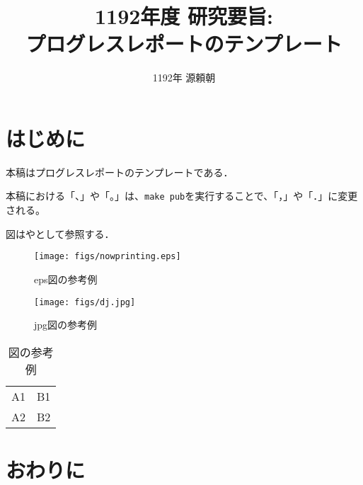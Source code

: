 \documentclass[twocolumn]{preport}
\title{1192年度 研究要旨: \\
プログレスレポートのテンプレート}
\author{1192年 源頼朝}
\begin{document}
\pagestyle{empty}
\maketitle
\thispagestyle{empty}
\sloppy

\section{はじめに}

本稿はプログレスレポートのテンプレートである\cite{Sakai}．

本稿における「、」や「。」は、\verb|make pub|を実行することで、「，」や「．」に変更される。

図はやとして参照する．

\begin{figure}[tbh]
 \begin{center}
  \begin{minipage}{0.3\columnwidth}
   \texttt{[image: figs/nowprinting.eps]}
   \caption{eps図の参考例}
  \end{minipage}
  \hspace{0.15\columnwidth}
  \begin{minipage}{0.3\columnwidth}
   \texttt{[image: figs/dj.jpg]}
   \caption{jpg図の参考例}
  \end{minipage}
  \label{figure:nowprinting}
 \end{center}
\end{figure}

\begin{table}[tbh]
 \begin{center}
  \begin{tabular}{|l|r|} \hline
  A1 & B1 \\
  A2 & B2 \\ \hline
  \end{tabular}
  \caption{図の参考例}
  \label{table:sample}
 \end{center}
\end{table}

\section{おわりに}



\end{document}
